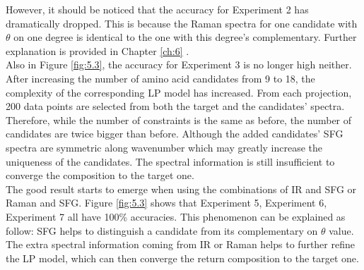 However, it should be noticed that the accuracy for Experiment 2 has dramatically dropped. This is because the Raman spectra for one candidate with $\theta$ on one degree is identical to the one with this degree's complementary. Further explanation  is provided in Chapter \ref{ch:6} . \\

Also in Figure \ref{fig:5.3}, the accuracy for Experiment 3 is no longer high neither. After increasing the number of amino acid candidates from 9 to 18, the complexity of the corresponding LP model has increased. From each projection, 200 data points are selected from both the target and the candidates' spectra. Therefore, while the number of constraints is the same as before, the number of candidates are twice bigger than before. Although the added candidates' SFG spectra are symmetric along wavenumber which may greatly increase the uniqueness of the candidates. The spectral information is still insufficient to converge the composition to the target one. \\


The good result starts to emerge when using the combinations of IR and SFG or Raman and SFG. Figure \ref{fig:5.3} shows that Experiment 5, Experiment 6, Experiment 7 all have 100\% accuracies. This phenomenon can be explained as follow: SFG helps to distinguish a candidate from its complementary on $\theta$ value. The extra spectral information coming from IR or Raman helps to further refine the LP model, which can then converge the return composition to the target one. \\

